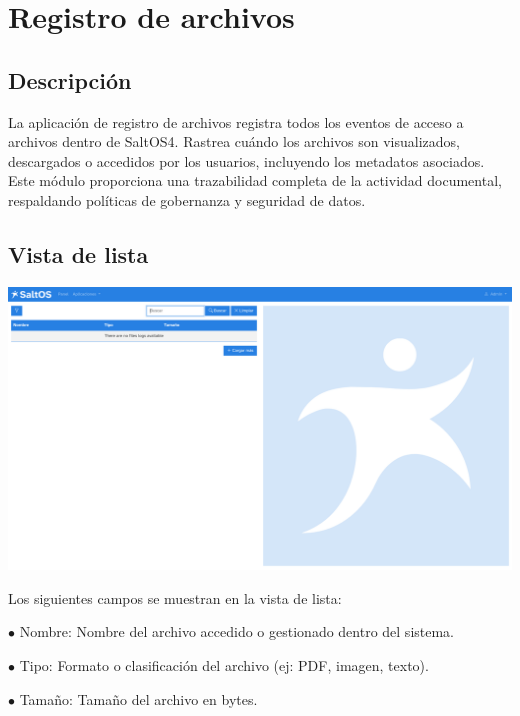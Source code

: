 \documentclass[a4paper]{article}
\begin{document}
\hypertarget{toc16}{}
\section{Registro de archivos}

\hypertarget{toc17}{}
\subsection{Descripción}

La aplicación de registro de archivos registra todos los eventos de acceso a archivos dentro de SaltOS4.
Rastrea cuándo los archivos son visualizados, descargados o accedidos por los usuarios, incluyendo los metadatos asociados.
Este módulo proporciona una trazabilidad completa de la actividad documental, respaldando políticas de gobernanza y seguridad de datos.

\hypertarget{toc18}{}
\subsection{Vista de lista}

\begin{center}\includegraphics[width=1\textwidth]{../ujest/snaps/test-screenshots-js-screenshots-common-fileslog-list-es-es-1-snap.png}\end{center}

Los siguientes campos se muestran en la vista de lista:

\begin{compactitem}
\item[\color{myblue}$\bullet$] Nombre: Nombre del archivo accedido o gestionado dentro del sistema.
\item[\color{myblue}$\bullet$] Tipo: Formato o clasificación del archivo (ej: PDF, imagen, texto).
\item[\color{myblue}$\bullet$] Tamaño: Tamaño del archivo en bytes.
\end{compactitem}
\end{document}
